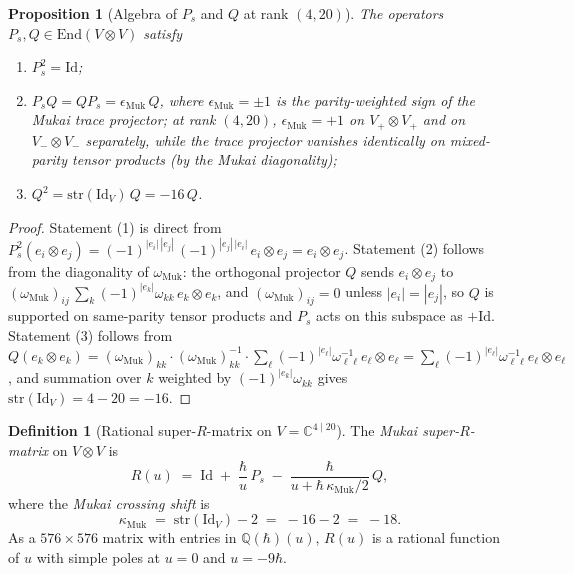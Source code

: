 \documentclass{article}
\providecommand{\C}{\mathbb C}
\providecommand{\Q}{\mathbb Q}
\providecommand{\End}{\mathrm{End}}
\providecommand{\Id}{\mathrm{Id}}
\providecommand{\str}{\mathrm{str}}
\newtheorem{proposition}[theorem]{Proposition}
\theoremstyle{definition}
\newtheorem{definition}[theorem]{Definition}
\begin{document}
\begin{proposition}[Algebra of $P_s$ and $Q$ at rank $(4, 20)$]
\label{prop:r10-Ps-Q-algebra}
The operators $P_s, Q \in \End(V \otimes V)$ satisfy
\begin{enumerate}[label=\textup{(\arabic*)}]
\item $P_s^2 = \Id$;
\item $P_s Q = Q P_s = \epsilon_{\mathrm{Muk}}\, Q$, where
  $\epsilon_{\mathrm{Muk}} = \pm 1$ is the parity-weighted sign of
  the Mukai trace projector; at rank $(4, 20)$,
  $\epsilon_{\mathrm{Muk}} = +1$ on $V_+ \otimes V_+$ and on
  $V_- \otimes V_-$ separately, while the trace projector vanishes
  identically on mixed-parity tensor products (by the Mukai
  diagonality);
\item $Q^2 = \str(\Id_V)\, Q = -16\, Q$.
\end{enumerate}
\end{proposition}

\begin{proof}
Statement (1) is direct from
$P_s^2(e_i \otimes e_j) = (-1)^{|e_i|\,|e_j|}\, (-1)^{|e_j|\,|e_i|}\,
e_i \otimes e_j = e_i \otimes e_j$. Statement (2) follows from the
diagonality of $\omega_{\mathrm{Muk}}$: the orthogonal projector $Q$
sends $e_i \otimes e_j$ to $(\omega_{\mathrm{Muk}})_{ij}\,
\sum_k (-1)^{|e_k|} \omega_{kk}\, e_k \otimes e_k$, and
$(\omega_{\mathrm{Muk}})_{ij} = 0$ unless $|e_i| = |e_j|$, so $Q$ is
supported on same-parity tensor products and $P_s$ acts on this
subspace as $+\Id$. Statement (3) follows from
$Q(e_k \otimes e_k) = (\omega_{\mathrm{Muk}})_{kk} \cdot
(\omega_{\mathrm{Muk}})^{-1}_{kk} \cdot \sum_{\ell} (-1)^{|e_\ell|}
\omega^{-1}_{\ell\ell} e_\ell \otimes e_\ell = \sum_{\ell}
(-1)^{|e_\ell|} \omega^{-1}_{\ell\ell} e_\ell \otimes e_\ell$, and
summation over $k$ weighted by $(-1)^{|e_k|} \omega_{kk}$ gives
$\str(\Id_V) = 4 - 20 = -16$.
\end{proof}

\begin{definition}[Rational super-$R$-matrix on $V = \C^{4 \mid 20}$]
\label{def:r10-R-matrix}
The \emph{Mukai super-$R$-matrix} on $V \otimes V$ is
\begin{equation}\label{eq:r10-R-matrix}
  R(u)
  \;=\;
  \Id
    \;+\; \frac{\hbar}{u}\, P_s
    \;-\; \frac{\hbar}{u + \hbar\, \kappa_{\mathrm{Muk}}/2}\, Q,
\end{equation}
where the \emph{Mukai crossing shift} is
\begin{equation}\label{eq:r10-kappa-Muk}
  \kappa_{\mathrm{Muk}}
  \;=\;
  \str(\Id_V) - 2
  \;=\;
  -16 - 2
  \;=\;
  -18.
\end{equation}
As a $576 \times 576$ matrix with entries in $\Q(\hbar)(u)$,
$R(u)$ is a rational function of $u$ with simple poles at $u = 0$
and $u = -9\hbar$.
\end{definition}
\end{document}
